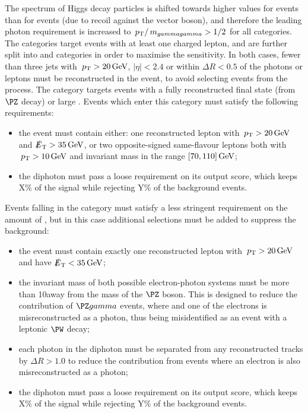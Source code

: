 The \pT spectrum of Higgs decay particles is shifted towards higher values for \VH events than for \ggH events (due to recoil against the vector boson), and therefore the leading photon \pT requirement is increased to $\,p_\text{T}/\,m_{gammagamma} >1/2$ for all \VHTag categories. The \VHLeptonicTag categories target events with at least one charged lepton, and are further split into \VHLooseLeptonicTag and \VHTightLeptonicTag categories in order to maximise the sensitivity. In both cases, fewer than three jets with $\,p_\text{T}>20\,\text{Ge\hspace{-.08em}V}$, $|\eta|<2.4$ or within $\Delta R <0.5$ of the photons or leptons must be reconstructed in the event, to avoid selecting events from the \ttH process. The \VHTightLeptonicTag category targets events with a fully reconstructed final state (from $\PZ$ decay) or large \MET. Events which enter this category must satisfy the following requirements:
\begin{itemize}
\item the event must contain either: one reconstructed lepton with $\,p_\text{T}>20\,\text{Ge\hspace{-.08em}V}$ and $\slashed{E}_{\mathrm{T}} > 35\,\text{Ge\hspace{-.08em}V}$, or two opposite-signed same-flavour leptons both with $\,p_\text{T}>10\,\text{Ge\hspace{-.08em}V}$ and invariant mass in the range $[70,110]\,\text{Ge\hspace{-.08em}V}$;
\item the diphoton must pass a loose requirement on its \DiPhoBdt output score, which keeps X\% of the signal while rejecting Y\% of the background events.
\end{itemize}

Events falling in the \VHLooseLeptonicTag category must satisfy a less stringent requirement on the amount of \MET, but in this case additional selections must be added to suppress the \SM background:
\begin{itemize}
\item the event must contain exactly one reconstructed lepton with $\,p_\text{T}>20\,\text{Ge\hspace{-.08em}V}$ and have $\slashed{E}_{\mathrm{T}} < 35\,\text{Ge\hspace{-.08em}V}$;
\item the invariant mass of both possible electron-photon systems must be more than 10\GeV away from the mass of the $\PZ$ boson. This is designed to reduce the contribution of $\PZ\gamma$ events, where \Zee and one of the electrons is misreconstructed as a photon, thus being misidentified as an \VH event with a leptonic $\PW$ decay; 
\item each photon in the diphoton must be separated from any reconstructed tracks by $\Delta R >1.0$ to reduce the contribution from \DY events where an electron is also misreconstructed as a photon;
\item the diphoton must pass a loose requirement on its \DiPhoBdt output score, which keeps X\% of the signal while rejecting Y\% of the background events.
\end{itemize}

